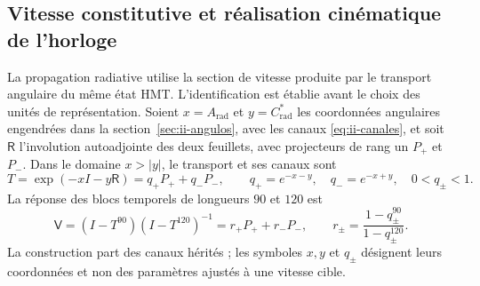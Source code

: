 \subsection{Vitesse constitutive et réalisation cinématique de l’horloge}
\label{v:sec:enlace-velocidad-constitutiva}

La propagation radiative utilise la section de vitesse produite par le
transport angulaire du même état HMT. L’identification est établie
avant le choix des unités de représentation. Soient $x=A_{\mathrm{rad}}$ et
$y=C^*_{\mathrm{rad}}$ les coordonnées angulaires engendrées dans la
section~\ref{sec:ii-angulos}, avec les canaux
\eqref{eq:ii-canales}, et soit
$\mathsf R$ l’involution autoadjointe des deux feuillets, avec projecteurs
de rang un $P_+$ et $P_-$. Dans le domaine $x>|y|$, le transport et ses
canaux sont
\begin{equation}
 T=\exp(-xI-y\mathsf R)=q_+P_++q_-P_-,
 \qquad q_+=e^{-x-y},\quad q_-=e^{-x+y},\quad 0<q_\pm<1.
 \label{v:eq:velocidad-transporte}
\end{equation}
La réponse des blocs temporels de longueurs $90$ et $120$ est
\begin{equation}
 \mathsf V=(I-T^{90})(I-T^{120})^{-1}
       =r_+P_++r_-P_-,\qquad
 r_\pm=\frac{1-q_\pm^{90}}{1-q_\pm^{120}}.
 \label{v:eq:velocidad-respuesta}
\end{equation}
La construction part des canaux hérités ; les symboles $x,y$ et
$q_\pm$ désignent leurs coordonnées et non des paramètres ajustés à une vitesse
cible.

